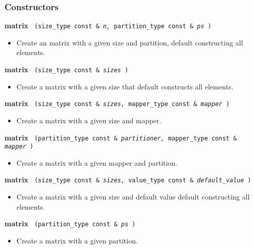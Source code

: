 \subsubsection{Constructors}

\noindent
\textbf{matrix}%
\texttt{%
(size\_type const \&
\textit{n,}%
partition\_type const \&
\textit{ps}%
)
}

\begin{itemize}
\item
Create an matrix with a given size and partition, default constructing all elements. 
\end{itemize}
 
\noindent
\textbf{matrix}%
\texttt{%
(size\_type const \&
\textit{sizes}%
)
}

\begin{itemize}
\item
Create a matrix with a given size that default constructs all elements. 
\end{itemize}
 
\noindent
\textbf{matrix}%
\texttt{%
(size\_type const \&
\textit{sizes,}%
mapper\_type const \&
\textit{mapper}%
)
}

\begin{itemize}
\item
Create a matrix with a given size and mapper. 
\end{itemize}
 
\noindent
\textbf{matrix}%
\texttt{%
(partition\_type const \&
\textit{partitioner,}%
mapper\_type const \&
\textit{mapper}%
)
}

\begin{itemize}
\item
Create a matrix with a given mapper and partition. 
\end{itemize}
 
\noindent
\textbf{%
matrix 
}
\texttt{%
(size\_type const \&
\textit{sizes,}%
value\_type const \&
\textit{default\_value}%
)
}

\begin{itemize}
\item
Create a matrix with a given size and default value default constructing all elements. 
\end{itemize}
 
\noindent
\textbf{matrix}%
\texttt{%
(partition\_type const \&
\textit{ps}%
)
}

\begin{itemize}
\item
Create a matrix with a given partition. 
\end{itemize}

